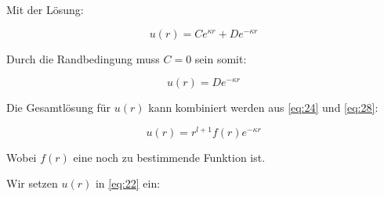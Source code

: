 Mit der Lösung:

\begin{equation}
  \label{eq:27}
  u(r) = Ce^{\kappa r}+De^{-\kappa r}
\end{equation}

Durch die Randbedingung muss \(C=0\) sein somit:

\begin{equation}
  \label{eq:28}
    u(r) = De^{-\kappa r}
\end{equation}

Die Gesamtlösung für \(u(r)\) kann kombiniert werden aus \eqref{eq:24} und \eqref{eq:28}:

\begin{equation}
  \label{eq:29}
  u(r) = r^{l+1}f(r)e^{-\kappa r}
\end{equation}

Wobei \(f(r)\) eine noch zu bestimmende Funktion ist.  

Wir setzen \(u(r)\) in \eqref{eq:22} ein:


